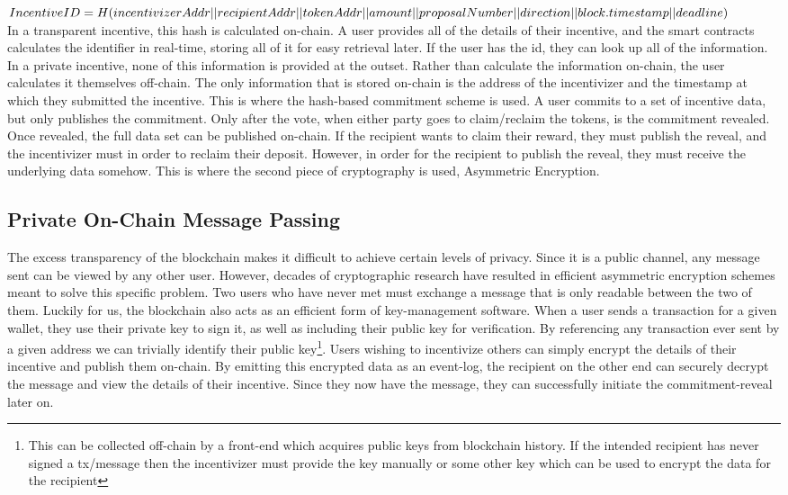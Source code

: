 \documentclass{article}
\begin{document}
$IncentiveID = H(incentivizerAddr || recipientAddr ||tokenAddr||amount\\||proposalNumber||direction||block.timestamp||deadline)$\\

In a transparent incentive, this hash is calculated on-chain. A user provides all of the details of their incentive, and the smart contracts calculates the identifier in real-time, storing all of it for easy retrieval later. If the user has the id, they can look up all of the information. In a private incentive, none of this information is provided at the outset. Rather than calculate the information on-chain, the user calculates it themselves off-chain. The only information that is stored on-chain is the address of the incentivizer and the timestamp at which they submitted the incentive. This is where the hash-based commitment scheme is used. A user commits to a set of incentive data, but only publishes the commitment. Only after the vote, when either party goes to claim/reclaim the tokens, is the commitment revealed. Once revealed, the full data set can be published on-chain. If the recipient wants to claim their reward, they must publish the reveal, and the incentivizer must in order to reclaim their deposit. However, in order for the recipient to publish the reveal, they must receive the underlying data somehow. This is where the second piece of cryptography is used, Asymmetric Encryption.

\subsection{Private On-Chain Message Passing}
\indent The excess transparency of the blockchain makes it difficult to achieve certain levels of privacy. Since it is a public channel, any message sent can be viewed by any other user. However, decades of cryptographic research have resulted in efficient asymmetric encryption schemes meant to solve this specific problem. Two users who have never met must exchange a message that is only readable between the two of them. Luckily for us, the blockchain also acts as an efficient form of key-management software. When a user sends a transaction for a given wallet, they use their private key to sign it, as well as including their public key for verification. By referencing any transaction ever sent by a given address we can trivially identify their public key\footnote{This can be collected off-chain by a front-end which acquires public keys from blockchain history. If the intended recipient has never signed a tx/message then the incentivizer must provide the key manually or some other key which can be used to encrypt the data for the recipient}. Users wishing to incentivize others can simply encrypt the details of their incentive and publish them on-chain. By emitting this encrypted data as an event-log, the recipient on the other end can securely decrypt the message and view the details of their incentive. Since they now have the message, they can successfully initiate the commitment-reveal later on.
\end{document}
